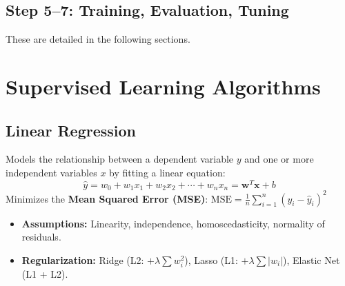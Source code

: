 \documentclass[11pt,a4paper]{article}
\begin{document}
\subsection{Step 5--7: Training, Evaluation, Tuning}
These are detailed in the following sections.

\section{Supervised Learning Algorithms}

\subsection{Linear Regression}

\begin{definitionbox}
Models the relationship between a dependent variable $y$ and one or more independent variables $x$ by fitting a linear equation:
$$\hat{y} = w_0 + w_1 x_1 + w_2 x_2 + \cdots + w_n x_n = \mathbf{w}^T \mathbf{x} + b$$
Minimizes the \textbf{Mean Squared Error (MSE)}: $\text{MSE} = \frac{1}{n}\sum_{i=1}^{n}(y_i - \hat{y}_i)^2$
\end{definitionbox}

\begin{center}
\end{center}

\begin{itemize}[leftmargin=*]
  \item \textbf{Assumptions:} Linearity, independence, homoscedasticity, normality of residuals.
  \item \textbf{Regularization:} Ridge (L2: $+\lambda\sum w_i^2$), Lasso (L1: $+\lambda\sum |w_i|$), Elastic Net (L1 + L2).
\end{itemize}
\end{document}
